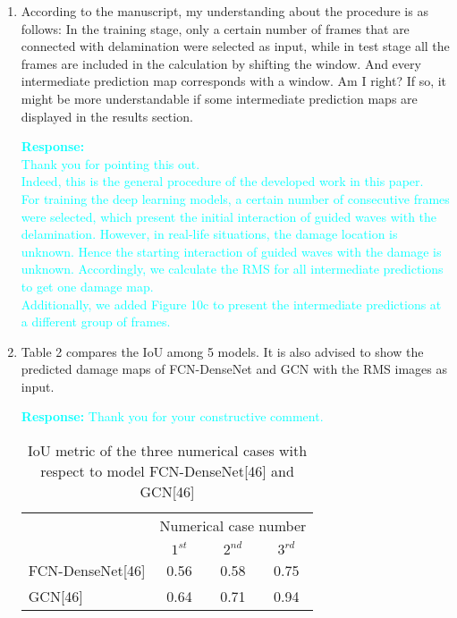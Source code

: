 \documentclass[11pt,a2paper]{report}
\begin{document}
\begin{enumerate}
	\item According to the manuscript, my understanding about the procedure is 
	as follows: In the training stage, only a certain number of frames that are 
	connected with delamination were selected as input, while in test stage all 
	the frames are included in the calculation by shifting the window.
	And every intermediate prediction map corresponds with a window. 
	Am I right? If so, it might be more understandable if some intermediate 
	prediction maps are displayed in the results section.

\textcolor{Cyan}{
	\textbf{Response:} \\
	Thank you for pointing this out. \\
	Indeed, this is the general procedure of the developed work in this paper.\\
	For training the deep learning models, a certain number of consecutive frames were selected, which present the initial interaction of guided waves with the delamination.
	However, in real-life situations, the damage location is unknown.
	Hence the starting interaction of guided waves with the damage is unknown.
	Accordingly, we calculate the RMS for all intermediate predictions to get one damage map. \\
	Additionally, we added Figure 10c to present the intermediate predictions at a different group of frames.
}

	\item Table 2 compares the IoU among 5 models. 
	It is also advised to show 
	the predicted damage maps of FCN-DenseNet and GCN with the RMS images as 
	input.

\textcolor{Cyan}
{
	\textbf{Response:}
	Thank you for your constructive comment.\\
	\begin{table}[ht!]
		\centering
		\begin{tabular}{lccc}
			\toprule
			& \multicolumn{3}{l}{Numerical case number} \\
			& \(1^{st}\) & \(2^{nd}\) & \(3^{rd}\) \\ 
			\midrule
			FCN-DenseNet[46] & 0.56 & 0.58 & 0.75 \\
			GCN[46]          & 0.64 & 0.71 & 0.94 \\ 
			\bottomrule
		\end{tabular}
	\caption{IoU metric of the three numerical cases with respect to model FCN-DenseNet[46] and GCN[46]}
	\end{table}
}

\end{enumerate}	
\end{document}
